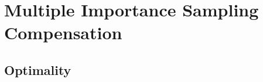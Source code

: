\chapter{Multiple Importance Sampling Compensation}
\label{ch:mis_compensation}

\section{Optimality}
\label{sec:misc_optimality}

